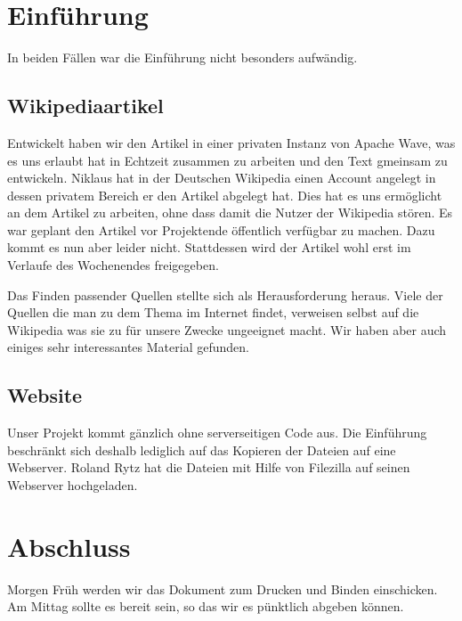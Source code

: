 \documentclass[11pt,paper=a4,final]{scrartcl}
\begin{document}
\section{Einf\"uhrung}
\label{sec:einfuehrung}
In beiden F\"allen war die Einf\"uhrung nicht besonders aufw\"andig.
\subsection{Wikipediaartikel}
Entwickelt haben wir den Artikel in einer privaten Instanz von Apache Wave, was
es uns erlaubt hat in Echtzeit zusammen zu arbeiten und den Text gmeinsam zu
entwickeln.
Niklaus hat in der Deutschen Wikipedia einen Account angelegt in dessen privatem
Bereich er den Artikel abgelegt hat. Dies hat es uns erm\"oglicht an dem Artikel
zu arbeiten, ohne dass damit die Nutzer der Wikipedia st\"oren.
Es war geplant den Artikel vor Projektende \"offentlich verf\"ugbar zu machen.
Dazu kommt es nun aber leider nicht. Stattdessen wird der Artikel wohl erst im
Verlaufe des Wochenendes freigegeben.

Das Finden passender Quellen stellte sich als Herausforderung heraus. Viele der
\glqq Quellen \grqq die man zu dem Thema im Internet findet, verweisen selbst
auf die Wikipedia was sie zu f\"ur unsere Zwecke ungeeignet macht. Wir haben
aber auch einiges sehr interessantes Material gefunden.
\subsection{Website}
Unser Projekt kommt g\"anzlich ohne serverseitigen Code aus. Die Einf\"uhrung
beschr\"ankt sich deshalb lediglich auf das Kopieren der Dateien auf eine
Webserver. Roland Rytz hat die Dateien mit Hilfe von Filezilla auf seinen
Webserver hochgeladen.
\section{Abschluss}
\label{sec:abschluss}
Morgen Fr\"uh werden wir das Dokument zum Drucken und Binden einschicken. Am
Mittag sollte es bereit sein, so das wir es p\"unktlich abgeben k\"onnen.
\end{document}
